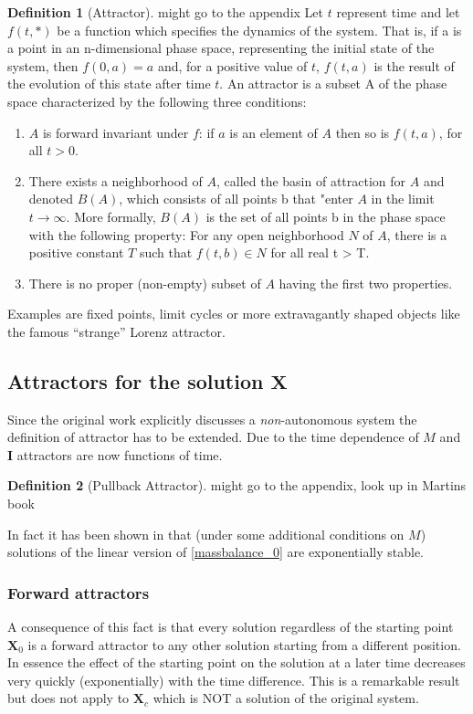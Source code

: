 \documentclass[journal abbreviation, manuscript]{copernicus}
\theoremstyle{definition}
\newtheorem{definition}{Definition}[section]
\newcommand{\X}{\mathbf{X}}
\newcommand{\I}{\mathbf{I}}
\begin{document}
\begin{definition}[Attractor]
{\color{red} might go to the appendix}
  Let $t$ represent time and let $f(t, *)$ be a function which specifies the dynamics of the system. That is, if a is a point in an n-dimensional phase space, representing the initial state of the system, then $f(0, a) = a$ and, for a positive value of $t$, $f(t, a)$ is the result of the evolution of this state after time $t$. 
  An attractor is a subset A of the phase space characterized by the following three conditions:
  \begin{enumerate}
    \item
      $A$ is forward invariant under $f$: if $a$ is an element of $A$ then so is $f(t,a)$, for all $t > 0$.
    \item
      There exists a neighborhood of $A$, called the basin of attraction for
      $A$ and denoted $B(A)$, which consists of all points b that "enter $A$ in
      the limit $t\rightarrow \infty$.  More formally, $B(A)$ is the set of all
      points b in the phase space with the following property: For any open
      neighborhood $N$ of $A$, there is a positive constant $T$ such that
      $f(t,b)\in N$ for all real t > T.
    \item
      There is no proper (non-empty) subset of $A$ having the first two properties.
  \end{enumerate}

\end{definition}
Examples are fixed points, limit cycles or more extravagantly shaped objects like the  
famous ``strange'' Lorenz attractor. 


\subsection{Attractors for the solution $\X$}
Since the original work explicitly discusses a \emph{non}-autonomous system the definition of attractor has to be extended. Due to the time dependence of $M$ and $\I$ attractors are now functions of time.
\begin{definition}[Pullback Attractor]
{\color{red} might go to the appendix, look up in Martins book}

\end{definition}
In fact it has been shown in \citep{Rasmussen2016JMB} that (under some additional conditions on $M$) solutions of the linear version of  \eqref{massbalance_0} are exponentially stable. 
\subsubsection{Forward attractors}
A consequence of this fact is that every solution regardless of the starting point $\X_0$ is a forward attractor to any other solution starting from a different position. 
In essence the effect of the starting point on the solution at a later time decreases very quickly (exponentially) with the time difference. 
This is a remarkable result but does not apply to $\X_c$ which is NOT a solution of the original system. 
\end{document}

